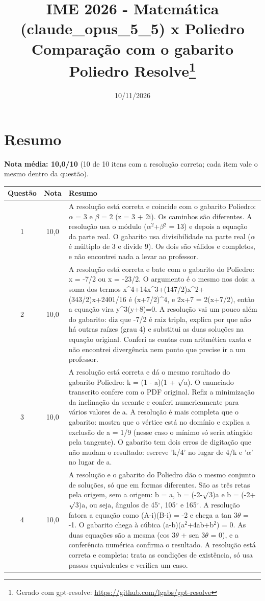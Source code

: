\documentclass{article}%
\title{IME 2026 {-} Matemática (claude\_opus\_5\_5) x Poliedro\\[4pt]\large Comparação com o gabarito Poliedro Resolve\thanks{Gerado com gpt-resolve: \url{https://github.com/lgabs/gpt-resolve}}}%
\date{10/11/2026}%
\begin{document}
%
\normalsize%
\maketitle%
\section*{Resumo}\textbf{Nota média: 10,0/10} (10 de 10 itens com a resolução correta; cada item vale o mesmo dentro da questão).\par\medskip%
\begin{longtable}{@{}c c p{}@{}}\toprule Questão & Nota & Resumo \\ \midrule
1 & 10,0 & A resolução está correta e coincide com o gabarito Poliedro: $\alpha$ = 3 e $\beta$ = 2 (z = 3 + 2i). Os caminhos são diferentes. A resolução usa o módulo ($\alpha$$^2$+$\beta$$^2$ = 13) e depois a equação da parte real. O gabarito usa divisibilidade na parte real ($\alpha$ é múltiplo de 3 e divide 9). Os dois são válidos e completos, e não encontrei nada a levar ao professor. \\
2 & 10,0 & A resolução está correta e bate com o gabarito do Poliedro: x = -7/2 ou x = -23/2. O argumento é o mesmo nos dois: a soma dos termos x\^{}4+14x\^{}3+(147/2)x\^{}2+(343/2)x+2401/16 é (x+7/2)\^{}4, e 2x+7 = 2(x+7/2), então a equação vira y\^{}3(y+8)=0. A resolução vai um pouco além do gabarito: diz que -7/2 é raiz tripla, explica por que não há outras raízes (grau 4) e substitui as duas soluções na equação original. Conferi as contas com aritmética exata e não encontrei divergência nem ponto que precise ir a um professor. \\
3 & 10,0 & A resolução está correta e dá o mesmo resultado do gabarito Poliedro: k = (1 - a)(1 + $\surd$a). O enunciado transcrito confere com o PDF original. Refiz a minimização da inclinação da secante e conferi numericamente para vários valores de a. A resolução é mais completa que o gabarito: mostra que o vértice está no domínio e explica a exclusão de a = 1/9 (nesse caso o mínimo só seria atingido pela tangente). O gabarito tem dois erros de digitação que não mudam o resultado: escreve 'k/4' no lugar de 4/k e '$\alpha$' no lugar de a. \\
4 & 10,0 & A resolução e o gabarito do Poliedro dão o mesmo conjunto de soluções, só que em formas diferentes. São as três retas pela origem, sem a origem: b = a, b = (-2-$\surd$3)a e b = (-2+$\surd$3)a, ou seja, ângulos de 45$^\circ$, 105$^\circ$ e 165$^\circ$. A resolução fatora a equação como (A-i)(B-i) = -2 e chega a tan 3$\theta$ = -1. O gabarito chega à cúbica (a-b)(a$^2$+4ab+b$^2$) = 0. As duas equações são a mesma (cos 3$\theta$ + sen 3$\theta$ = 0), e a conferência numérica confirma o resultado. A resolução está correta e completa: trata as condições de existência, só usa passos equivalentes e verifica um caso. \\

\end{longtable}
\end{document}
